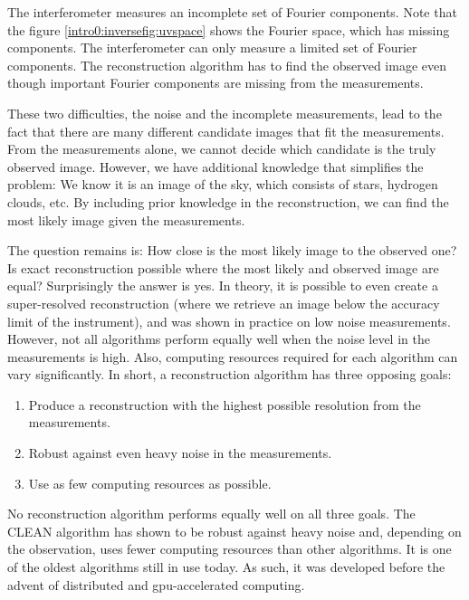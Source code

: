 The interferometer measures an incomplete set of Fourier components. Note that the figure \ref{intro0:inversefig:uvspace} shows the Fourier space, which has missing components. The interferometer can only measure a limited set of Fourier components. The reconstruction algorithm has to find the observed image even though important Fourier components are missing from the measurements.

These two difficulties, the noise and the incomplete measurements, lead to the fact that there are many different candidate images that fit the measurements. From the measurements alone, we cannot decide which candidate is the truly observed image. However, we have additional knowledge that simplifies the problem: We know it is an image of the sky, which consists of stars, hydrogen clouds, etc. By including prior knowledge in the reconstruction, we can find the most likely image given the measurements. 

The question remains is: How close is the most likely image to the observed one? Is exact reconstruction possible where the most likely and observed image are equal? Surprisingly the answer is yes. In theory, it is possible to even create a super-resolved reconstruction (where we retrieve an image below the accuracy limit of the instrument)\cite{candes2006robust,donoho2006compressed}, and was shown in practice on low noise measurements\cite{dabbech2018cygnus, dabbech2015moresane}. However, not all algorithms perform equally well when the noise level in the measurements is high. Also, computing resources required for each algorithm can vary significantly. In short, a reconstruction algorithm has three opposing goals:
\begin{enumerate}
	\item Produce a reconstruction with the highest possible resolution from the measurements.
	\item Robust against even heavy noise in the measurements.
	\item Use as few computing resources as possible.
\end{enumerate}

No reconstruction algorithm performs equally well on all three goals. The CLEAN algorithm\cite{hogbom1974aperture, rau2011multi} has shown to be robust against heavy noise and, depending on the observation, uses fewer computing resources than other algorithms\cite{offringa2017optimized}. It is one of the oldest algorithms still in use today. As such, it was developed before the advent of distributed and gpu-accelerated computing.



